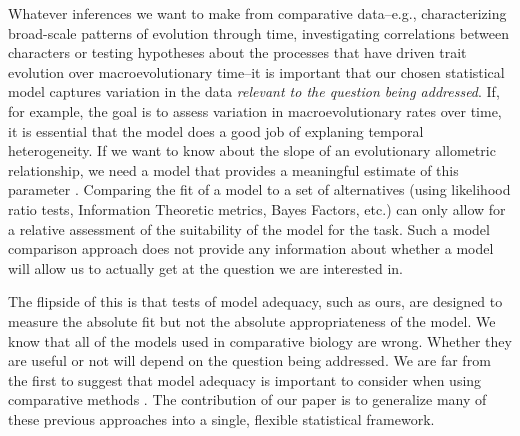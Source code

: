 Whatever inferences we want to make from comparative data--e.g., characterizing broad-scale patterns of evolution through time, investigating correlations between characters or testing hypotheses about the processes that have driven trait evolution over macroevolutionary time--it is important that our chosen statistical model captures variation in the data \emph{relevant to the question being addressed}. If, for example, the goal is to assess variation in macroevolutionary rates over time, it is essential that the model does a good job of explaning temporal heterogeneity. If we want to know about the slope of an evolutionary allometric relationship, we need a model that provides a meaningful estimate of this parameter \citep{Hansen2012SysBio}. Comparing the fit of a model to a set of alternatives (using likelihood ratio tests, Information Theoretic metrics, Bayes Factors, etc.) can only allow for a relative assessment of the suitability of the model for the task. Such a model comparison approach does not provide any information about whether a model will allow us to actually get at the question we are interested in. 

The flipside of this is that tests of model adequacy, such as ours, are designed to measure the absolute fit but not the absolute appropriateness of the model. We know that all of the models used in comparative biology are wrong. Whether they are useful or not will depend on the question being addressed. We are far from the first to suggest that model adequacy is important to consider when using comparative methods \citep[see, for example][]{Felsenstein1985, Felsenstein1988, HarveyPagel1991, Garland1992, Diaz1996, HansenMartins1996, Price1997, Garland1999, GarlandIves2000, HansenOrzack2005, Hansen2012SysBio, Felsenstein2012, Boettiger2012, SlaterPennell, Beaulieu2013, Blackmon2014}. The contribution of our paper is to generalize many of these previous approaches into a single, flexible statistical framework. 

